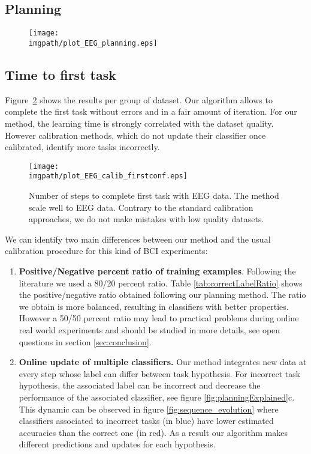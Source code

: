 \subsection{Planning}

\begin{figure}[!ht]
    \centering
    \texttt{[image: \\imgpath/plot\_EEG\_planning.eps]}
    \caption{}
    \label{fig:planningEEG}
\end{figure}



\subsection{Time to first task}

Figure~\ref{fig:firstEEG} shows the results per group of dataset. Our algorithm allows to complete the first task without errors and in a fair amount of iteration.  For our method, the learning time is strongly correlated with the dataset quality. However calibration methods, which do not update their classifier once calibrated, identify more tasks incorrectly.

\begin{figure}[!ht]
\centering
\texttt{[image: \\imgpath/plot\_EEG\_calib\_firstconf.eps]}
\caption{Number of steps to complete first task with EEG data. The method scale well to EEG data. Contrary to the standard calibration approaches, we do not make mistakes with low quality datasets.}
\label{fig:firstEEG}
\end{figure} 

We can identify two main differences between our method and the usual calibration procedure for this kind of BCI experiments:
\begin{enumerate}
\item \textbf{Positive/Negative percent ratio of training examples}. Following the literature \cite{chavarriaga2010learning, iturrate2013task} we used a 80/20 percent ratio. Table \ref{tab:correctLabelRatio} shows the positive/negative ratio obtained following our planning method. The ratio we obtain is more balanced, resulting in classifiers with better properties. However a 50/50 percent ratio may lead to practical problems during online real world experiments and should be studied in more details, see open questions in section \ref{sec:conclusion}.
\item \textbf{Online update of multiple classifiers.} Our method integrates new data at every step whose label can differ between task hypothesis. For incorrect task hypothesis, the associated label can be incorrect and decrease the performance of the associated classifier, see figure \ref{fig:planningExplained}c. This dynamic can be observed in figure \ref{fig:sequence_evolution} where classifiers associated to incorrect tasks (in blue) have lower estimated accuracies than the correct one (in red). As a result our algorithm makes different predictions and updates for each hypothesis.
\end{enumerate}


